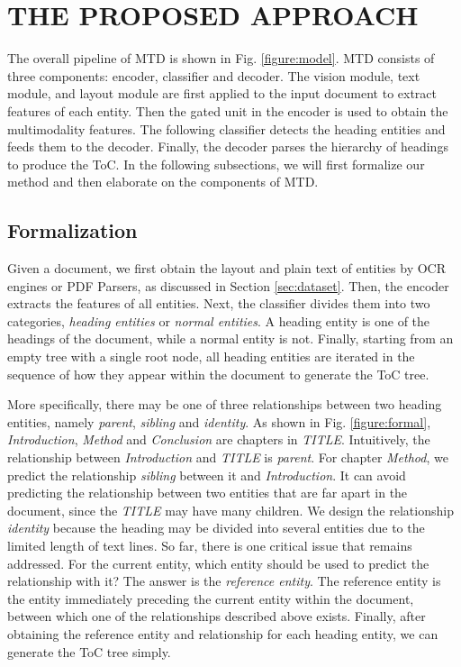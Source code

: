 \documentclass[a4paper,conference]{IEEEtran}
\begin{document}
\section{THE PROPOSED APPROACH}
The overall pipeline of MTD is shown in Fig. \ref{figure:model}. MTD consists of three components: encoder, classifier and decoder. The vision module, text module, and layout module are first applied to the input document to extract features of each entity. Then the gated unit in the encoder is used to obtain the multimodality features. The following classifier detects the heading entities and feeds them to the decoder. Finally, the decoder parses the hierarchy of headings to produce the ToC. In the following subsections, we will first formalize our method and then elaborate on the components of MTD.

\subsection{Formalization\label{sub:formalization}}
Given a document, we first obtain the layout and plain text of entities by OCR engines or PDF Parsers, as discussed in Section \ref{sec:dataset}. Then, the encoder extracts the features of all entities. Next, the classifier divides them into two categories, \textit{heading entities} or \textit{normal entities}. A heading entity is one of the headings of the document, while a normal entity is not. Finally, starting from an empty tree with a single root node, all heading entities are iterated in the sequence of how they appear within the document to generate the ToC tree.

More specifically, there may be one of three relationships between two heading entities, namely  \textit{parent}, \textit{sibling} and \textit{identity}. As shown in Fig. \ref{figure:formal}, \textit{Introduction}, \textit{Method} and \textit{Conclusion} are chapters in \textit{TITLE}. Intuitively, the relationship between \textit{Introduction} and \textit{TITLE} is \textit{parent}. For chapter \textit{Method}, we predict the relationship \textit{sibling} between it and \textit{Introduction}. It can avoid predicting the relationship between two entities that are far apart in the document, since the \textit{TITLE} may have many children. We design the relationship \textit{identity} because the heading may be divided into several entities due to the limited length of text lines. So far, there is one critical issue that remains addressed. For the current entity, which entity should be used to predict the relationship with it? The answer is the \textit{reference entity}. The reference entity is the entity immediately preceding the current entity within the document, between which one of the relationships described above exists. Finally, after obtaining the reference entity and relationship for each heading entity, we can generate the ToC tree simply.
\end{document}
